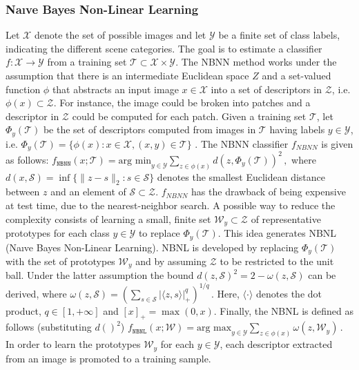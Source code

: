 \subsubsection{Naıve Bayes Non-Linear Learning }\label{header-n673}

Let ${\mathcal X}$ denote the set of possible images and let
${\mathcal Y}$ be a finite set of class labels, indicating the
different scene categories. The goal is to estimate a classifier
$f : {\mathcal X} \rightarrow {\mathcal Y}$ from a training set
${\mathcal T} \subset {\mathcal X} \times {\mathcal Y}$. The NBNN
method works under the assumption that there is an intermediate
Euclidean space $Z$ and a set-valued function $\phi$ that abstracts
an input image $x \in {\mathcal X}$ into a set of descriptors in
${\mathcal Z}$, i.e. $\phi(x) \subset {\mathcal Z}$. For instance,
the image could be broken into patches and a descriptor in
${\mathcal Z}$ could be computed for each patch. Given a training set
${\mathcal T}$, let $\Phi_y({\mathcal T})$ be the set of descriptors
computed from images in ${\mathcal T}$ having labels
$y \in {\mathcal Y}$, i.e.
$\Phi_y({\mathcal T}) = \{\phi(x): x \in {\mathcal X}, (x, y) \in {\mathcal T}\}$
. The NBNN classifier $f_{NBNN}$ is given as follows:
\newline
$ f_\mathtt {NBNN}(x; {\mathcal T})=\text{arg min}_{y\in {\mathcal Y}}\sum _{z\in \phi (x)}d(z,\Phi _y({\mathcal T}))^2\,, $
\newline
where $d(x, {\mathcal S}) = \inf\{\| z − s\|_2 : s \in {\mathcal S}\}$
denotes the smallest Euclidean distance between $z$ and an element of
$  {\mathcal S} \subset {\mathcal Z}$. $f_{NBNN}$ has the drawback
of being expensive at test time, due to the nearest-neighbor search. A
possible way to reduce the complexity consists of learning a small,
finite set ${\mathcal W}_y \subset {\mathcal Z}$ of representative
prototypes for each class $y \in {\mathcal Y}$ to replace
$\Phi_y({\mathcal T})$. This idea generates NBNL (Naıve Bayes
Non-Linear Learning). NBNL is developed by replacing
$\Phi_y({\mathcal T})$ with the set of prototypes ${\mathcal W}_y$
and by assuming ${\mathcal Z}$ to be restricted to the unit ball.
Under the latter assumption the bound
$d(z, {\mathcal S})^{2} = 2 - \omega(z, {\mathcal S}) $ can be
derived, where
\newline
$ \omega (z, {\mathcal S})= \left(\sum _{s\in {\mathcal S}}|\langle z,s\rangle |_+^{q}\right)^{1/q}\,. $
\newline
Here, $\langle \cdot \rangle$ denotes the dot product,
$q \in [1, +\infty]$ and $[x]_+ = \max(0, x)$. Finally, the NBNL is
defined as follows (substituting $d()^{2}$)
\newline
$ f_\mathtt {NBNL}(x; {\mathcal W})=\text{arg max}_{y\in {\mathcal Y}}\sum _{z\in \phi (x)}\omega (z, {\mathcal W} _y)\,. $
\newline
In order to learn the prototypes ${\mathcal W}_y$ for each
$y \in {\mathcal Y}$, each descriptor extracted from an image is
promoted to a training sample.

